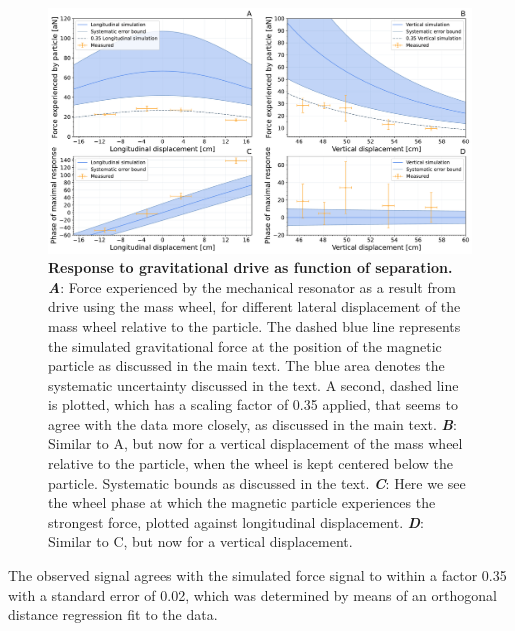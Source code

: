 \documentclass[pdflatex,sn-mathphys,12pt]{sn-jnl}
\begin{document}
    \begin{figure}[ht]%
        \centering
        \includegraphics[width=\textwidth]{Results/paper_full_combined.pdf}%
        \caption{\textbf{Response to gravitational drive as function of separation.}\\
        \textbf{\emph{A}}: Force experienced by the mechanical resonator as a result from drive using the mass wheel, for different lateral displacement of the mass wheel relative to the particle. The dashed blue line represents the simulated gravitational force at the position of the magnetic particle as discussed in the main text. The blue area denotes the systematic uncertainty discussed in the text. A second, dashed line is plotted, which has a scaling factor of 0.35 applied, that seems to agree with the data more closely, as discussed in the main text. \textbf{\emph{B}}: Similar to A, but now for a vertical displacement of the mass wheel relative to the particle, when the wheel is kept centered below the particle. Systematic bounds as discussed in the text.   \textbf{\emph{C}}: Here we see the wheel phase at which the magnetic particle experiences the strongest force, plotted against longitudinal displacement. \textbf{\emph{D}}: Similar to C, but now for a vertical displacement.\\}\label{fig3:force}
    \end{figure}
    
    The observed signal agrees with the simulated force signal to within a factor 0.35 with a standard error of 0.02, which was determined by means of an orthogonal distance regression fit to the data.
\end{document}
